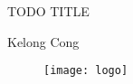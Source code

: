 \begin{titlepage}

\null\vfill

\begin{center}
\LARGE{TODO TITLE}
\end{center}

\vspace{1.5cm}

\begin{center}
Kelong Cong
\end{center}

\vfill

\begin{figure}[!b]
\centering
\texttt{[image: logo]}
\end{figure}

\vspace{2.0cm}

\end{titlepage}

